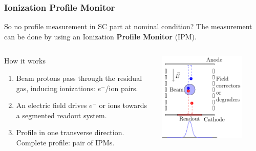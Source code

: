\begin{frame}
  \frametitle{Ionization Profile Monitor}
  \begin{alertblock}{So no profile measurement in SC part at nominal condition?}
    The measurement can be done by using an Ionization \textbf{Profile Monitor} (IPM).
  \end{alertblock}

  \begin{columns}
    \begin{column}{0.45\textwidth}
      \begin{block}{How it works}
        \begin{enumerate}
          \item Beam protons pass through the residual gas, inducing ionizations: $e^-$/ion pairs.
          \item An electric field drives $e^-$ or ions towards a segmented readout system.
          \item Profile in one transverse direction. Complete profile: pair of IPMs.
        \end{enumerate}
      \end{block}
    \end{column}
    \begin{column}{0.45\textwidth}
      \centering
      \includegraphics[width=0.8\textwidth]{02_ESS/fig/fig000_IPM.pdf}
    \end{column}
  \end{columns}
\end{frame}

